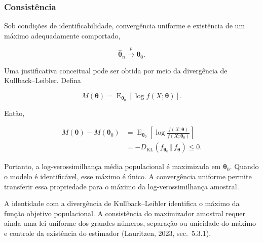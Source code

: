 \documentclass[
  letterpaper,
  DIV=11,
  numbers=noendperiod]{scrreprt}
\begin{document}
\subsubsection{Consistência}\label{consistuxeancia-1}

\begin{tcolorbox}[enhanced jigsaw, colback=white, leftrule=.75mm, colbacktitle=quarto-callout-important-color!10!white, breakable, titlerule=0mm, bottomtitle=1mm, title=\textcolor{quarto-callout-important-color}{\faExclamation}\hspace{0.5em}{Propriedade: consistência}, colframe=quarto-callout-important-color-frame, toprule=.15mm, opacityback=0, bottomrule=.15mm, opacitybacktitle=0.6, arc=.35mm, toptitle=1mm, rightrule=.15mm, coltitle=black, left=2mm]

Sob condições de identificabilidade, convergência uniforme e existência
de um máximo adequadamente comportado,

\[\widehat{\boldsymbol\theta}_n
\xrightarrow{p}
\boldsymbol\theta_0.\]

\end{tcolorbox}

Uma justificativa conceitual pode ser obtida por meio da divergência de
Kullback--Leibler. Defina

\[M(\boldsymbol\theta)
=
\operatorname{E}_{\boldsymbol\theta_0}
\left[
\log f(X;\boldsymbol\theta)
\right].\]

Então,

\[\begin{aligned}
M(\boldsymbol\theta)
-
M(\boldsymbol\theta_0)
&=
\operatorname{E}_{\boldsymbol\theta_0}
\left[
\log
\frac{
f(X;\boldsymbol\theta)
}{
f(X;\boldsymbol\theta_0)
}
\right]\\
&=
-
D_{\mathrm{KL}}
\left(
f_{\boldsymbol\theta_0}
\,\Vert\,
f_{\boldsymbol\theta}
\right)
\leq 0.
\end{aligned}\]

Portanto, a log-verossimilhança média populacional é maximizada em
\(\boldsymbol\theta_0\). Quando o modelo é identificável, esse máximo é
único. A convergência uniforme permite transferir essa propriedade para
o máximo da log-verossimilhança amostral.

\begin{tcolorbox}[enhanced jigsaw, colback=white, leftrule=.75mm, colbacktitle=quarto-callout-warning-color!10!white, breakable, titlerule=0mm, bottomtitle=1mm, title=\textcolor{quarto-callout-warning-color}{\faExclamationTriangle}\hspace{0.5em}{Observação --- alcance do argumento}, colframe=quarto-callout-warning-color-frame, toprule=.15mm, opacityback=0, bottomrule=.15mm, opacitybacktitle=0.6, arc=.35mm, toptitle=1mm, rightrule=.15mm, coltitle=black, left=2mm]

A identidade com a divergência de Kullback--Leibler identifica o máximo
da função objetivo populacional. A consistência do maximizador amostral
requer ainda uma lei uniforme dos grandes números, separação ou
unicidade do máximo e controle da existência do estimador (Lauritzen,
2023, sec.~5.3.1).

\end{tcolorbox}
\end{document}
